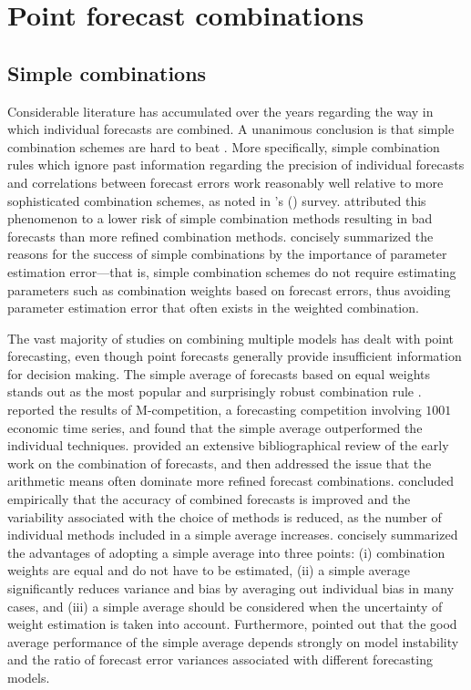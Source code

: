 \documentclass[11pt]{article}
\def\citeapos#1{\citeauthor{#1}'s (\citeyear{#1})}
\begin{document}
\section{Point forecast combinations}

\subsection{Simple combinations}

Considerable literature has accumulated over the years regarding the way in which individual forecasts are combined. A unanimous conclusion is that simple combination schemes are hard to beat \citep{Clemen1989-fb,Stock2004-rq,Lichtendahl2020-ut}. More specifically, simple combination rules which ignore past information regarding the precision of individual forecasts and correlations between forecast errors work reasonably well relative to more sophisticated combination schemes, as noted in \citeapos{Clemen1989-fb} survey. \cite{Lichtendahl2020-ut} attributed this phenomenon to a lower risk of simple combination methods resulting in bad forecasts than more refined combination methods. \cite{Timmermann2006-en} concisely summarized the reasons for the success of simple combinations by the importance of parameter estimation error---that is, simple combination schemes do not require estimating parameters such as combination weights based on forecast errors, thus avoiding parameter estimation error that often exists in the weighted combination.

The vast majority of studies on combining multiple models has dealt with point forecasting, even though point forecasts generally provide insufficient information for decision making. The simple average of forecasts based on equal weights stands out as the most popular and surprisingly robust combination rule \citep[see][]{Bunn1985-vo,Clemen1986-pd,Stock2003-sp,Genre2013-ut}. \cite{Makridakis1982-hb} reported the results of M-competition, a forecasting competition involving $1001$ economic time series, and found that the simple average outperformed the individual techniques. \cite{Clemen1989-fb} provided an extensive bibliographical review of the early work on the combination of forecasts, and then addressed the issue that the arithmetic means often dominate more refined forecast combinations. \cite{Makridakis1983-hg} concluded empirically that the accuracy of combined forecasts is improved and the variability associated with the choice of methods is reduced, as the number of individual methods included in a simple average increases. \cite{Palm1992-im} concisely summarized the advantages of adopting a simple average into three points: (i) combination weights are equal and do not have to be estimated, (ii) a simple average significantly reduces variance and bias by averaging out individual bias in many cases, and (iii) a simple average should be considered when the uncertainty of weight estimation is taken into account. Furthermore, \cite{Timmermann2006-en} pointed out that the good average performance of the simple average depends strongly on model instability and the ratio of forecast error variances associated with different forecasting models.
\end{document}
